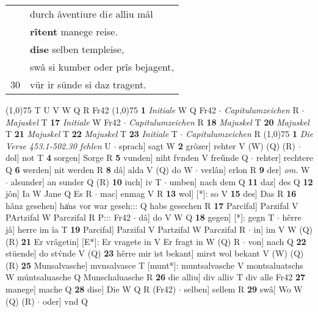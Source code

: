 \documentclass[8pt,a4paper,notitlepage]{article}
\begin{document}
\begin{table}[ht]
\begin{minipage}[t]{0.5\linewidth}
\begin{tabular}{rl}
 & durch âventiure di\textit{e} alliu mâl\\ 
 & \textbf{rîtent} manege reise.\\ 
 & \textbf{dise} selben templeise,\\ 
 & swâ si kumber oder prîs bejagent,\\ 
30 & vür ir sünde si daz tragent.\\ 
\end{tabular}
\scriptsize
\line(1,0){75} \newline
T U V W Q R Fr42 \newline
\line(1,0){75} \newline
\textbf{1} \textit{Initiale} W Q Fr42   $\cdot$ \textit{Capitulumzeichen} R   $\cdot$ \textit{Majuskel} T  \textbf{17} \textit{Initiale} W Fr42   $\cdot$ \textit{Capitulumzeichen} R  \textbf{18} \textit{Majuskel} T  \textbf{20} \textit{Majuskel} T  \textbf{21} \textit{Majuskel} T  \textbf{22} \textit{Majuskel} T  \textbf{23} \textit{Initiale} T   $\cdot$ \textit{Capitulumzeichen} R  \newline
\line(1,0){75} \newline
\textbf{1} \textit{Die Verse 453.1-502.30 fehlen} U   $\cdot$ sprach] sagt W \textbf{2} grôzer] rehter V (W) (Q) (R)  $\cdot$ dol] not T \textbf{4} sorgen] Sorge R \textbf{5} vunden] niht fvnden V freűnde Q  $\cdot$ rehter] rechtere Q \textbf{6} werden] nit werden R \textbf{8} dâ] alda V (Q) do W  $\cdot$ verlân] erlon R \textbf{9} der] \textit{om.} W  $\cdot$ alsunder] an sunder Q (R) \textbf{10} iuch] iv T  $\cdot$ umben] nach dem Q \textbf{11} daz] des Q \textbf{12} jôn] Ia W Jane Q Es R  $\cdot$ mac] enmag V R \textbf{13} wol] [*]: so V \textbf{15} des] Das R \textbf{16} hânz gesehen] ha͑ns vor war geseh::: Q habs gesechen R \textbf{17} Parcifal] Parzifal V PArtzifal W Parczifal R P::: Fr42  $\cdot$ dâ] do V W Q \textbf{18} gegen] [*]: gegn T  $\cdot$ hêrre jâ] herre im îa T \textbf{19} Parcifal] Parzifal V Partzifal W Parczifal R  $\cdot$ in] im V W (Q) (R) \textbf{21} Er vrâgetin] [E*]: Er vragete in V Er fragt in W (Q) R  $\cdot$ von] nach Q \textbf{22} stüende] do stv́nde V (Q) \textbf{23} hêrre mir ist bekant] mirst wol bekant V (W) (Q) (R) \textbf{25} Munsalvasche] mvnsalvasce T [munt*]: muntsalvasche V montsaluatschs W múntsaluasche Q Munschaluasche R \textbf{26} die alliu] div alliv T div alle Fr42 \textbf{27} manege] mache Q \textbf{28} dise] Die W Q R (Fr42)  $\cdot$ selben] sellem R \textbf{29} swâ] Wo W (Q) (R)  $\cdot$ oder] vnd Q \newline
\end{minipage}
\end{table}
\end{document}
